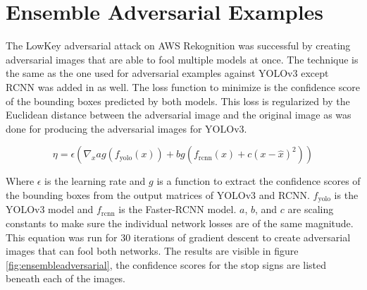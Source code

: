 \documentclass{article}
\begin{document}
\section{Ensemble Adversarial Examples}

The LowKey adversarial attack \cite{cherepanova2021lowkey} on AWS Rekognition was successful by creating adversarial images that are able to fool multiple models at once. The technique is the same as the one used for adversarial examples against YOLOv3 \cite{redmon2018yolov3} except RCNN \cite{ren2016faster} was added in as well. The loss function to minimize is the confidence score of the bounding boxes predicted by both models. This loss is regularized by the Euclidean distance between the adversarial image and the original image as was done for producing the adversarial images for YOLOv3.

\begin{equation}
    \eta = \epsilon (\nabla_x ag(f_{\text{yolo}}(x)) + bg(f_{\text{rcnn}}(x) + c(x - \hat{x})^2))
\end{equation}

Where $\epsilon$ is the learning rate and $g$ is a function to extract the confidence scores of the bounding boxes from the output matrices of YOLOv3 and RCNN. $f_{\text{yolo}}$ is the YOLOv3 model and $f_{\text{rcnn}}$ is the Faster-RCNN model. $a$, $b$, and $c$ are scaling constants to make sure the individual network losses are of the same magnitude. This equation was run for 30 iterations of gradient descent to create adversarial images that can fool both networks. The results are visible in figure \ref{fig:ensembleadversarial}, the confidence scores for the stop signs are listed beneath each of the images.
\end{document}
